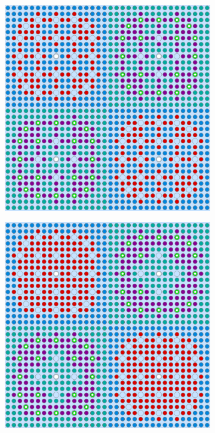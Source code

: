 \begin{figure}[h!]
\centering
\begin{subfigure}{0.47\textwidth}
  \centering
  \includegraphics[width=0.9\linewidth]{figures/unsupervised/geometries/with-features/2-clusters/pinch/2x2}
  \caption{}
  \label{fig:chap10-2x2-pinch-2}
\end{subfigure}%
\begin{subfigure}{0.47\textwidth}
  \centering
  \includegraphics[width=0.9\linewidth]{figures/unsupervised/geometries/with-features/2-clusters/combined/2x2}

\end{subfigure}
\end{figure}
